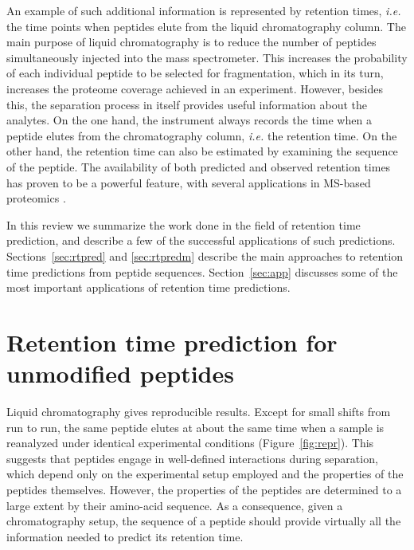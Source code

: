 \documentclass[a4paper]{article}
\begin{document}
An example of such additional information is represented by retention
times, {\em i.e.} the time points when peptides elute from the liquid
chromatography column.  The main purpose of liquid chromatography is
to reduce the number of peptides simultaneously injected into the mass
spectrometer. This increases the probability of each individual
peptide to be selected for fragmentation, which in its turn, increases
the proteome coverage achieved in an experiment.  However, besides
this, the separation process in itself provides useful information
about the analytes. On the one hand, the instrument always records the
time when a peptide elutes from the chromatography column, {\em i.e.}
the retention time. On the other hand, the retention time can also be
estimated by examining the sequence of the peptide. The availability
of both predicted and observed retention times has proven to be a
powerful feature, with several applications in MS-based proteomics
\cite{Palmblad2013}.


In this review we summarize the work done in the field of retention
time prediction, and describe a few of the successful applications of
such predictions. Sections~\ref{sec:rtpred} and \ref{sec:rtpredm}
describe the main approaches to retention time predictions from
peptide sequences. Section~\ref{sec:app} discusses some of the most
important applications of retention time predictions.


\section{\label{sec:rtpred}Retention time prediction for unmodified peptides}


Liquid chromatography gives reproducible results. Except for small
shifts from run to run, the same peptide elutes at about the same time
when a sample is reanalyzed under identical experimental conditions
(Figure~\ref{fig:repr}). This suggests that peptides engage in
well-defined interactions during separation, which depend only on the
experimental setup employed and the properties of the peptides
themselves. However, the properties of the peptides are determined to
a large extent by their amino-acid sequence. As a consequence, given a
chromatography setup, the sequence of a peptide should provide
virtually all the information needed to predict its retention time.
\end{document}
